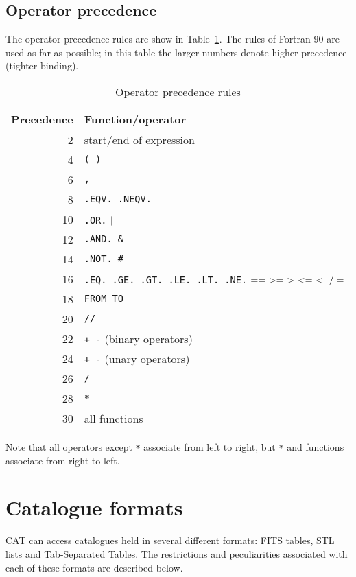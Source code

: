 \subsection{Operator precedence}

The operator precedence rules are show in Table~\ref{PREC}. The rules 
of Fortran 90 are used as far as possible; in this table the larger 
numbers denote higher precedence (tighter binding).

\begin{table}[htbp]

\begin{center}
\begin{tabular}{rl}
Precedence  & Function/operator  \\ \hline
  2 & start/end of expression  \\
  4 & {\tt (  )}  \\
  6 & {\tt ,}  \\
  8 & {\tt .EQV.  .NEQV.}  \\
 10 & {\tt  .OR.}   ${\tt |}$  \\
 12 & {\tt .AND.  \&} \\
 14 & {\tt .NOT.  \#}  \\
 16 & {\tt .EQ. .GE. .GT. .LE. .LT. .NE.} ${\tt == ~ >= ~ > ~ <= ~ < ~ /=}$ \\
 18 & {\tt FROM  TO}  \\
 20 & {\tt  //}  \\
 22 & {\tt  + -} (binary operators)  \\
 24 & {\tt  + -} (unary operators)  \\
 26 & {\tt  * /}  \\
 28 & {\tt  **}  \\
 30 & all functions  \\
\end{tabular}
\end{center}

\caption{\label{PREC}Operator precedence rules}

\end{table}


Note that all operators except {\tt **} associate from left to right, but
{\tt **} and functions associate from right to left.


\newpage
\section{\label{FORMAT}Catalogue formats}

CAT can access catalogues held in several different formats: FITS tables,
STL lists and Tab-Separated Tables.  The restrictions and peculiarities
associated with each of these formats are described below.

